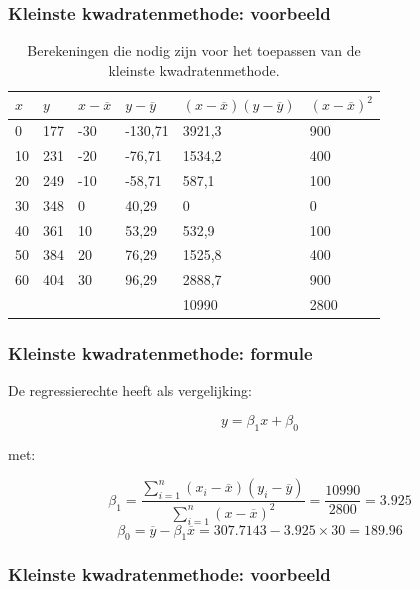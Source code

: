 \documentclass[aspectratio=169]{beamer}
\begin{document}
\begin{frame}
  \frametitle{Kleinste kwadratenmethode: voorbeeld}
  \begin{table}[h] \centering \footnotesize
    \begin{tabular}{@{}llllll@{}}
      \toprule
      $x$   & $y$     & $x-\overline{x}$    & $y - \overline{y}$        & $(x-\overline{x})(y - \overline{y})$       &  $(x-\overline{x})^{2}$    \\ \midrule
      0  & 177 & -30 & -130,71 & 3921,3 & 900  \\
      10 & 231 & -20 & -76,71  & 1534,2 & 400  \\
      20 & 249 & -10 & -58,71  & 587,1  & 100  \\
      30 & 348 & 0   & 40,29   & 0      & 0    \\
      40 & 361 & 10  & 53,29   & 532,9  & 100  \\
      50 & 384 & 20  & 76,29   & 1525,8 & 400  \\
      60 & 404 & 30  & 96,29   & 2888,7 & 900  \\
      &     &     &         & 10990  & 2800 \\ \bottomrule
    \end{tabular}
    \caption{Berekeningen die nodig zijn voor het toepassen van de kleinste kwadratenmethode.}
    \label{tab:rendieren2}
  \end{table}
\end{frame}

\begin{frame}
\frametitle{Kleinste kwadratenmethode: formule}
  De regressierechte heeft als vergelijking:
  
  \[ y = \beta_1 x + \beta_0 \]
  
  met:
  
  \[ \beta_{1} = \frac{\sum_{i=1}^{n} (x_{i}-\overline{x})(y_{i} - \overline{y})}{\sum_{i=1}^{n} (x-\overline{x})^{2}} = \frac{10990}{2800} = 3.925 \]
  \[ \beta_{0} = \overline{y} - \beta_{1} \overline{x} = 307.7143 - 3.925 \times 30 = 189.96 \]
\end{frame}

\begin{frame}
  \frametitle{Kleinste kwadratenmethode: voorbeeld}
  \centering
\end{frame}
\end{document}
